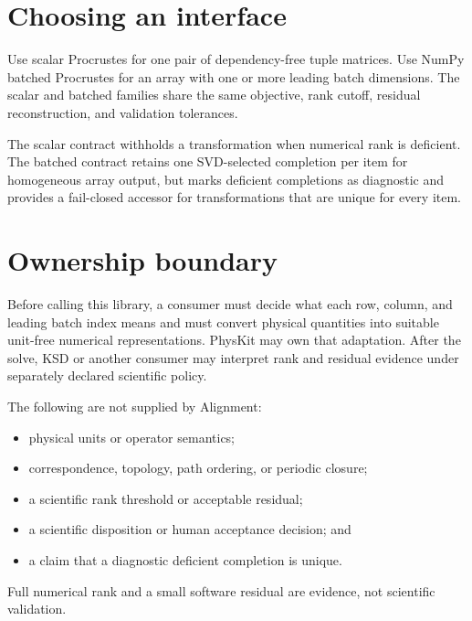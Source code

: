 \section{Choosing an interface}
Use scalar Procrustes for one pair of dependency-free tuple matrices. Use NumPy batched
Procrustes for an array with one or more leading batch dimensions. The scalar and batched
families share the same objective, rank cutoff, residual reconstruction, and validation
tolerances.

The scalar contract withholds a transformation when numerical rank is deficient. The
batched contract retains one SVD-selected completion per item for homogeneous array
output, but marks deficient completions as diagnostic and provides a fail-closed accessor
for transformations that are unique for every item.

\section{Ownership boundary}
Before calling this library, a consumer must decide what each row, column, and leading
batch index means and must convert physical quantities into suitable unit-free numerical
representations. PhysKit may own that adaptation. After the solve, KSD or another
consumer may interpret rank and residual evidence under separately declared scientific
policy.

The following are not supplied by Alignment:
\begin{itemize}
  \item physical units or operator semantics;
  \item correspondence, topology, path ordering, or periodic closure;
  \item a scientific rank threshold or acceptable residual;
  \item a scientific disposition or human acceptance decision; and
  \item a claim that a diagnostic deficient completion is unique.
\end{itemize}
Full numerical rank and a small software residual are evidence, not scientific
validation.
